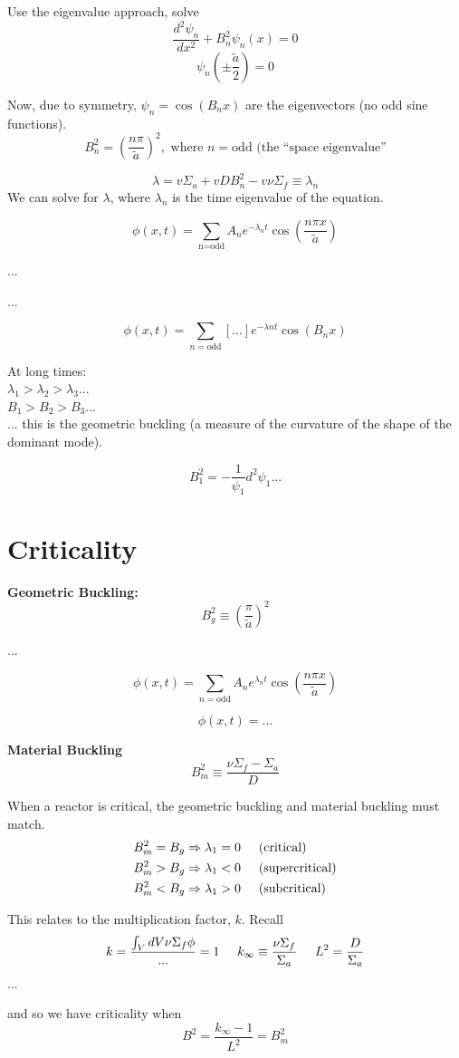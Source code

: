 \documentclass{report}
\newcommand{\h}[1]{\section*{#1}}
\newcommand{\Xs}{\Sigma}
\begin{document}
Use the eigenvalue approach, solve
$$ \frac{d^2\psi_n}{dx^2} + B_n^2\psi_n(x)=0 $$
$$ \psi_n(\pm\frac{\tilde{a}}{2}) = 0 $$

Now, due to symmetry, $\psi_n = \cos(B_n x)$ are the eigenvectors (no odd sine functions).
$$ B_n^2 = \left( \frac{n\pi}{\tilde{a}} \right)^2, \text{ where }n=\text{odd (the ``space eigenvalue''} $$

$$ \lambda = v \Xs_a + vDB_n^2 - v\nu\Xs_f \equiv \lambda_n $$
We can solve for $\lambda$, where $\lambda_n$ is the time eigenvalue of the equation.

$$ \phi(x,t) = \sum_{\text{n=odd}} A_n e^{-\lambda_n t}\cos\left(\frac{n \pi x}{\tilde{a}}\right)$$

...

...

$$ \phi(x,t) = \sum_{n=\text{odd}} \left[ ... \right]e^{-\lambda n t}\cos(B_n x)  $$

At long times: \\
$\lambda_1 > \lambda_2 > \lambda_3 ...$ \\
$B_1 > B_2 > B_3 ...$ \\
... this is the geometric buckling (a measure of the curvature of the shape of the dominant mode). 

$$ B_1^2 = -\frac{1}{\psi_1}{d^2\psi_1}{...} $$



\h{Criticality}

\textbf{Geometric Buckling:}
$$ B_g^2 \equiv \left(\frac{\pi}{\tilde{a}}\right)^2 $$

...

$$ \phi(x,t) = \sum_{n=\text{odd}} A_n e^{\lambda_n t} \cos\left(\frac{n\pi x}{\tilde{a}}\right) $$

$$ \phi(x,t) = ... $$

\textbf{Material Buckling}
$$ B_m^2 \equiv \frac{\nu \Xs_f-\Xs_a}{D} $$

When a reactor is critical, the geometric buckling and material buckling must match.
\begin{align*}
& B_m^2 = B_g \Rightarrow \lambda_1 = 0 \hspace{0.5cm} \text{(critical)} \\
& B_m^2 > B_g \Rightarrow \lambda_1 < 0 \hspace{0.5cm} \text{(supercritical)} \\
& B_m^2 < B_g \Rightarrow \lambda_1 > 0 \hspace{0.5cm} \text{(subcritical)} 
\end{align*}

This relates to the multiplication factor, $k$. Recall
$$ k = \frac{\int_V dV \nu\Xs_f\phi}{...} = 1 \hspace{0.5cm} k_{\infty} \equiv \frac{\nu\Xs_f}{\Xs_a} \hspace{0.5cm} L^2 = \frac{D}{\Xs_a} $$
...

and so we have criticality when 
$$ B^2 = \frac{k_{\infty}-1}{L^2} = B_m^2 $$
\end{document}
